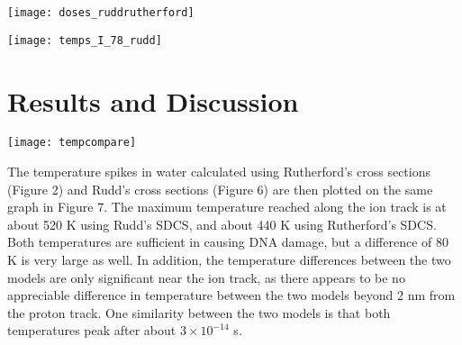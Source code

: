 \documentclass{article}
\begin{document}
\begin{multicols}{2}
%
\begin{center}
\texttt{[image: doses\_ruddrutherford]}
\captionsetup[figure]{format=hang,font=small}
\label{fig5}
\end{center}
\begin{center}
\texttt{[image: temps\_I\_78\_rudd]}
\captionsetup[figure]{format=hang,font=small}
\label{fig6}
\end{center}


\section {Results and Discussion}

\begin{center}
\texttt{[image: tempcompare]}
\captionsetup[figure]{format=hang,font=small}
\label{fig7}
\end{center}
The temperature spikes in water calculated using Rutherford's cross sections (Figure 2) and Rudd's cross sections (Figure 6) are then plotted on the same graph in Figure 7. The maximum temperature reached along the ion track is at about 520 K using Rudd's SDCS, and about 440 K using Rutherford's SDCS. Both temperatures are sufficient in causing DNA damage, but a difference of 80 K is very large as well. In addition, the temperature differences between the two models are only significant near the ion track, as there appears to be no appreciable difference in temperature between the two models beyond 2 nm from the proton track. One similarity between the two models is that both temperatures peak after about $3\times10^{-14}$ s.




\end{multicols}
\end{document}
